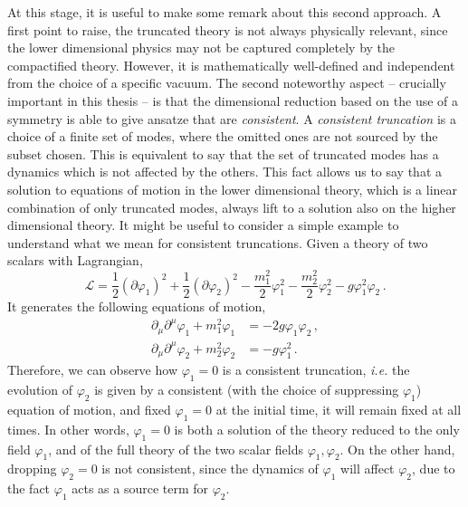 \documentclass[debug]{phd}
\begin{document}
				At this stage, it is useful to make some remark about this second approach.
				A first point to raise, the truncated theory is not always physically relevant, since the lower dimensional physics may not be captured completely by the compactified theory.
				However, it is mathematically well-defined and independent from the choice of a specific vacuum.
				The second noteworthy aspect -- crucially important in this thesis -- is that the dimensional reduction based on the use of a symmetry is able to give ansatze that are \emph{consistent}.
				A \emph{consistent truncation} is a choice of a finite set of modes, where the omitted ones are not sourced by the subset chosen. 
				This is equivalent to say that the set of truncated modes has a dynamics which is not affected by the others.
				This fact allows us to say that a solution to equations of motion in the lower dimensional theory, which is a linear combination of only truncated modes, always lift to a solution also on the higher dimensional theory.
				It might be useful to consider a simple example to understand what we mean for consistent truncations.
				Given a theory of two scalars with Lagrangian,
						\begin{equation*}
							\mathcal{L} = \frac{1}{2}\left(\partial \varphi_1 \right)^2 + \frac{1}{2}\left(\partial \varphi_2 \right)^2 - \frac{m_1^2}{2}\varphi_1^2 - \frac{m_2^2}{2}\varphi_2^2 - g \varphi_1^2\varphi_2 \, .
						\end{equation*}
				It generates the following equations of motion,
						\begin{equation*}
							\begin{split}
								\partial_\mu \partial^\mu \varphi_1 + m_1^2 \varphi_1 &= -2g\varphi_1\varphi_2 \, , \\
								\partial_\mu \partial^\mu \varphi_2 + m_2^2 \varphi_2 &= -g\varphi_1^2 \, .
							\end{split}
						\end{equation*}
				Therefore, we can observe how $\varphi_1 = 0$ is a consistent truncation, \emph{i.e.} the evolution of $\varphi_2$ is given by a consistent (with the choice of suppressing $\varphi_1$) equation of motion, and fixed $\varphi_1 = 0$ at the initial time, it will remain fixed at all times. 
				In other words, $\varphi_1 = 0$ is both a solution of the theory reduced to the only field $\varphi_1$, and of the full theory of the two scalar fields $\varphi_1,\varphi_2$. 
				On the other hand, dropping $\varphi_2 = 0$ is not consistent, since the dynamics of $\varphi_1$ will affect $\varphi_2$, due to the fact $\varphi_1$ acts as a source term for $\varphi_2$.
			
\end{document}
